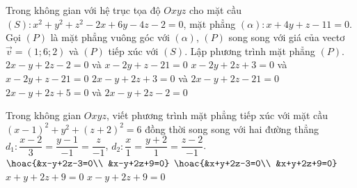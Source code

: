 \begin{ex}%
	Trong không gian với hệ trục tọa độ $Oxyz$ cho mặt cầu $(S)\colon x^2+y^2+z^2-2x+6y-4z-2=0$, mặt phẳng $(\alpha)\colon x+4y+z-11=0$. Gọi $(P)$ là mặt phẳng vuông góc với $(\alpha)$, $(P)$ song song với giá của vectơ $\overrightarrow{v}=(1;6;2)$ và $(P)$ tiếp xúc với $(S)$. Lập phương trình mặt phẳng $(P)$.
	\choice
	{$2x-y+2z-2=0$ và $x-2y+z-21=0$}
	{$x-2y+2z+3=0$ và $x-2y+z-21=0$}
	{\True $2x-y+2z+3=0$ và $2x-y+2z-21=0$}
	{$2x-y+2z+5=0$ và $2x-y+2z-2=0$}
\end{ex}
\begin{ex}%
	Trong không gian $Oxyz$, viết phương trình mặt phẳng tiếp xúc với mặt cầu $(x-1)^2+y^2+(z+2)^2=6$ đồng thời song song với hai đường thẳng $d_1\colon \dfrac{x-2}{3}=\dfrac{y-1}{-1}=\dfrac{z}{-1}$, $d_2\colon \dfrac{x}{1}=\dfrac{y+2}{1}=\dfrac{z-2}{-1}$.
	\choice
	{$\hoac{&x-y+2z-3=0\\ &x-y+2z+9=0}$}
	{\True $\hoac{&x+y+2z-3=0\\ &x+y+2z+9=0}$}
	{$x+y+2z+9=0$}
	{$x-y+2z+9=0$}
\end{ex}
